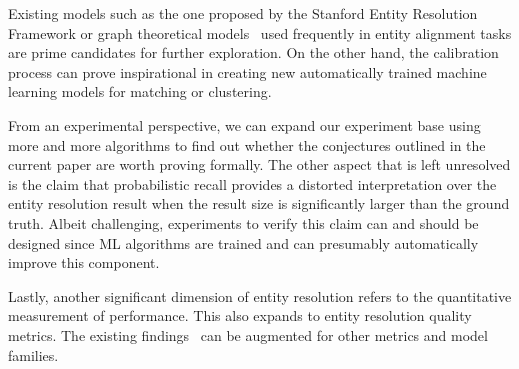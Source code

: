 \documentclass[journal]{IEEEtran}
\begin{document}
    Existing models such as the one proposed by the Stanford Entity Resolution
    Framework\cite{Ben2009Swoosh} or graph theoretical
    models~\cite{veletsianos2009-enali,Kon19,Li2020} used frequently in entity
    alignment tasks are prime candidates for further exploration.
    On the other hand, the calibration process can prove inspirational in
    creating new automatically trained machine learning models for matching or
    clustering.

    From an experimental perspective, we can expand our experiment base using
    more and more algorithms to find out whether the conjectures outlined in
    the current paper are worth proving formally.
    The other aspect that is left unresolved is the claim that probabilistic
    recall provides a distorted interpretation over the entity resolution result
    when the result size is significantly larger than the ground truth.
    Albeit challenging, experiments to verify this claim can and should be
    designed since ML algorithms are trained and can presumably automatically
    improve this component.

    Lastly, another significant dimension of entity resolution refers to the
    quantitative measurement of performance.
    This also expands to entity resolution quality metrics.
    The existing findings~\cite{matchescu-er-metrics2023} can be augmented for
    other metrics and model families.

    \balance
    
    
\end{document}
